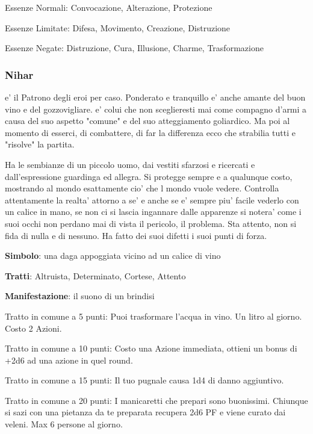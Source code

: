 \documentclass[a4paper,11pt,twoside,openany]{book}
\begin{document}
{		Essenze Normali: Convocazione, Alterazione, Protezione
		
		Essenze Limitate: Difesa, Movimento, Creazione, Distruzione
		
		Essenze Negate: Distruzione, Cura, Illusione, Charme, Trasformazione
		
		\subsubsection{Nihar}
		
		\label{nihar}
		
		e' il Patrono degli eroi per caso. Ponderato e tranquillo e' anche amante del buon vino e del gozzovigliare. e' colui che non sceglieresti mai come compagno d'armi a causa del suo aspetto "comune" e del suo atteggiamento goliardico. Ma poi al momento di esserci, di combattere, di far la differenza ecco che strabilia tutti e "risolve" la partita.
		
		Ha le sembianze di un piccolo uomo, dai vestiti sfarzosi e ricercati e dall'espressione guardinga ed allegra. Si protegge sempre e a qualunque costo, mostrando al mondo esattamente cio' che l mondo vuole vedere. Controlla attentamente la realta' attorno a se' e anche se e' sempre piu' facile vederlo con un calice in mano, se non ci si lascia ingannare dalle apparenze si notera' come i suoi occhi non perdano mai di vista il pericolo, il problema. Sta attento, non si fida di nulla e di nessuno. Ha fatto dei suoi difetti i suoi punti di forza.
		
		\textbf{Simbolo}: una daga appoggiata vicino ad un calice di vino
		
		\textbf{Tratti}: Altruista, Determinato, Cortese, Attento
		
		\textbf{Manifestazione}: il suono di un brindisi
		
		\bigskip
		
		Tratto in comune a 5 punti: Puoi trasformare l'acqua in vino. Un litro al giorno. Costo 2 Azioni.
		
		Tratto in comune a 10 punti: Costo una Azione immediata, ottieni un bonus di +2d6 ad una azione in quel round.
		
		Tratto in comune a 15 punti: Il tuo pugnale causa 1d4 di danno aggiuntivo.
		
		Tratto in comune a 20 punti: I manicaretti che prepari sono buonissimi. Chiunque si sazi con una pietanza da te preparata recupera 2d6 PF e viene curato dai veleni. Max 6 persone al giorno.
		
}
\end{document}
